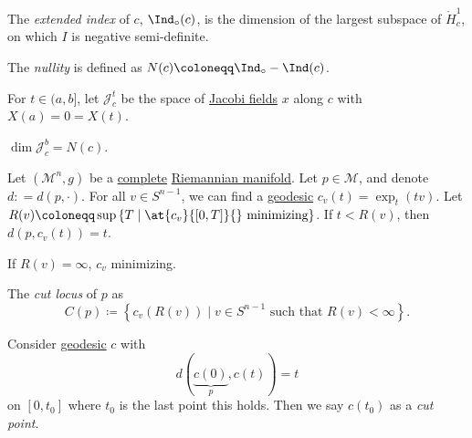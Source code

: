 \begin{definition}\label{def:exteded-index}
	The \emph{extended index} of \(c\), \(\Ind_{\circ }(c)\), is the dimension of the largest subspace of \(\mathring{H}_c^1\), on which \(I\) is negative semi-definite.
\end{definition}

\begin{definition}[Nullity]\label{def:nullity}
	The \emph{nullity} is defined as  \(N(c) \coloneqq \Ind_{\circ} - \Ind(c)\).
\end{definition}

For \(t\in (a, b]\), let \(\mathcal{J} ^t_c\) be the space of \hyperref[def:Jacobi-field]{Jacobi fields} \(x\) along \(c\) with \(X(a)= 0 = X(t)\).

\begin{lemma}
	\(\dim \mathcal{J} _c^b = N(c)\).
\end{lemma}

Let \((\mathcal{M}^n , g)\) be a \hyperref[def:geodesically-complete]{complete} \hyperref[def:Riemannian-manifold]{Riemannian manifold}. Let \(p\in \mathcal{M} \), and denote \(d\colon = d(p, \cdot)\). For all \(v\in S^{n-1}\), we can find a \hyperref[def:geodesic]{geodesic} \(c_v(t) = \exp _t(t v)\). Let \(R(v) \coloneqq \sup \left\{ T \mid \at{c_v}{[0, T]}{} \text{ minimizing}  \right\} \). If \(t < R(v)\), then \(d(p, c_v(t)) = t\).

\begin{eg}
	If \(R(v) = \infty \), \(c_v\) minimizing.
\end{eg}

\begin{definition}\label{def:cut-locus}
	The \emph{cut locus} of \(p\) as
	\[
		C(p) \coloneqq \left\{ c_v(R(v)) \mid v\in S^{n-1} \text{ such that } R(v) < \infty \right\}.
	\]
\end{definition}

\begin{definition}\label{def:cut-point}
	Consider \hyperref[def:geodesic]{geodesic} \(c\) with
	\[
		d(\underbrace{c(0)}_{p}, c(t)) = t
	\]
	on \([0, t_0]\) where \(t_0\) is the last point this holds. Then we say \(c(t_0)\) as a \emph{cut point}.
\end{definition}